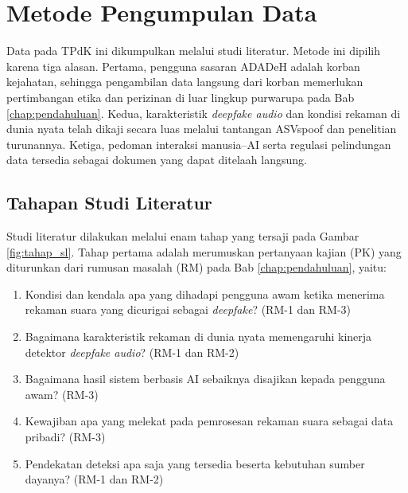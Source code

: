 \section{Metode Pengumpulan Data}
\label{metode_data}

Data pada TPdK ini dikumpulkan melalui studi literatur. Metode ini dipilih karena tiga alasan. Pertama, pengguna sasaran ADADeH adalah korban kejahatan, sehingga pengambilan data langsung dari korban memerlukan pertimbangan etika dan perizinan di luar lingkup purwarupa pada Bab \ref{chap:pendahuluan}. Kedua, karakteristik \textit{deepfake audio} dan kondisi rekaman di dunia nyata telah dikaji secara luas melalui tantangan ASVspoof dan penelitian turunannya. Ketiga, pedoman interaksi manusia--AI serta regulasi pelindungan data tersedia sebagai dokumen yang dapat ditelaah langsung.

\subsection{Tahapan Studi Literatur}
\label{tahap_sl}

Studi literatur dilakukan melalui enam tahap yang tersaji pada Gambar \ref{fig:tahap_sl}. Tahap pertama adalah merumuskan pertanyaan kajian (PK) yang diturunkan dari rumusan masalah (RM) pada Bab \ref{chap:pendahuluan}, yaitu:
\begin{enumerate}[{PK-}1.]
  \item Kondisi dan kendala apa yang dihadapi pengguna awam ketika menerima rekaman suara yang dicurigai sebagai \textit{deepfake}? (RM-1 dan RM-3)
  \item Bagaimana karakteristik rekaman di dunia nyata memengaruhi kinerja detektor \textit{deepfake audio}? (RM-1 dan RM-2)
  \item Bagaimana hasil sistem berbasis AI sebaiknya disajikan kepada pengguna awam? (RM-3)
  \item Kewajiban apa yang melekat pada pemrosesan rekaman suara sebagai data pribadi? (RM-3)
  \item Pendekatan deteksi apa saja yang tersedia beserta kebutuhan sumber dayanya? (RM-1 dan RM-2)
\end{enumerate}

